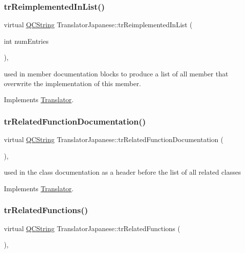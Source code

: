 \subsubsection{\texorpdfstring{trReimplementedInList()}{trReimplementedInList()}}
{\footnotesize\ttfamily virtual \mbox{\hyperlink{class_q_c_string}{Q\+C\+String}} Translator\+Japanese\+::tr\+Reimplemented\+In\+List (\begin{DoxyParamCaption}\item[{int}]{num\+Entries }\end{DoxyParamCaption})\hspace{0.3cm}{\ttfamily [inline]}, {\ttfamily [virtual]}}

used in member documentation blocks to produce a list of all member that overwrite the implementation of this member. 

Implements \mbox{\hyperlink{class_translator}{Translator}}.

\mbox{\label{class_translator_japanese_a4f76f007a15be60b0141e5892495baaf}} 
\subsubsection{\texorpdfstring{trRelatedFunctionDocumentation()}{trRelatedFunctionDocumentation()}}
{\footnotesize\ttfamily virtual \mbox{\hyperlink{class_q_c_string}{Q\+C\+String}} Translator\+Japanese\+::tr\+Related\+Function\+Documentation (\begin{DoxyParamCaption}{ }\end{DoxyParamCaption})\hspace{0.3cm}{\ttfamily [inline]}, {\ttfamily [virtual]}}

used in the class documentation as a header before the list of all related classes 

Implements \mbox{\hyperlink{class_translator}{Translator}}.

\mbox{\label{class_translator_japanese_a79ec63e57a7f3ee93379aeb0c0a488ba}} 
\subsubsection{\texorpdfstring{trRelatedFunctions()}{trRelatedFunctions()}}
{\footnotesize\ttfamily virtual \mbox{\hyperlink{class_q_c_string}{Q\+C\+String}} Translator\+Japanese\+::tr\+Related\+Functions (\begin{DoxyParamCaption}{ }\end{DoxyParamCaption})\hspace{0.3cm}{\ttfamily [inline]}, {\ttfamily [virtual]}}

